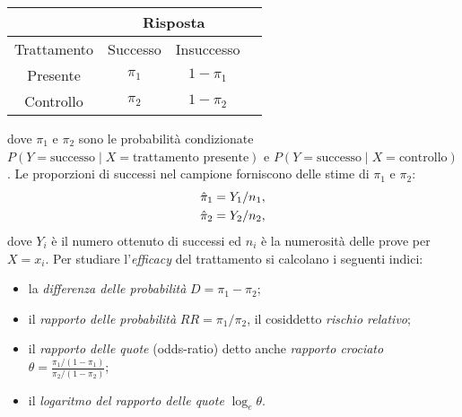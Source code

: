 \begin{center}
\begin{tabular}{cccc}
  \hline
    & \multicolumn{2}{c}{Risposta} &   \\
  \hline
Trattamento & Successo & Insuccesso  \\\hline
Presente & $\pi_1$ & $1-\pi_1$  \\
Controllo & $\pi_2$ & $1-\pi_2$  \\\hline
\end{tabular}
\end{center}
dove $\pi_1$ e $\pi_2$ sono le probabilità condizionate $P(Y = \text{successo} \mid X=\text{trattamento presente})$ e $P(Y = \text{successo} \mid X=\text{controllo})$.
Le  proporzioni di successi nel campione forniscono delle stime di $\pi_1$ e $\pi_2$:
\begin{align}
\hat{\pi}_1 &= Y_1/n_1,\notag\\
\hat{\pi}_2 & = Y_2/n_2,\notag
\end{align}
dove $Y_i$ è il numero ottenuto di successi ed $n_i$ è la numerosità delle prove per $X = x_i$.
Per studiare l'\emph{efficacy} del trattamento si calcolano i seguenti indici:
\begin{itemize}
    \item la \emph{differenza delle probabilità} $D=\pi_{1} -
    \pi_{2}$;
    \item il \emph{rapporto delle probabilità}
    $RR=\pi_{1} / \pi_{2}$, il cosiddetto \emph{rischio relativo};
    \item il \emph{rapporto delle quote} (odds-ratio) detto anche \emph{rapporto
    crociato} $\theta = \frac{\pi_1/(1-\pi_1)}{\pi_2/ (1-\pi_2)}$;
    \item il \emph{logaritmo del rapporto delle quote} $\log_e \theta$.
\end{itemize}

